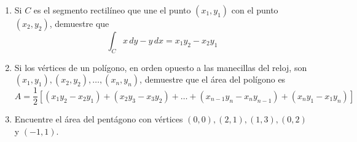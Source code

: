 \item
    \begin{enumerate}
        \item[(a)] Si $C$ es el segmento rectilíneo que une el punto $(x_1, y_1)$ con el punto $(x_2, y_2)$, demuestre que 
        \[ \int_C x \, dy - y \, dx = x_1 y_2 - x_2 y_1 \]
        \item[(b)] Si los vértices de un polígono, en orden opuesto a las manecillas del reloj, son $(x_1, y_1), (x_2, y_2), \dots , (x_n, y_n)$, demuestre que el área del polígono es
        \[ A = \frac{1}{2} [ (x_1 y_2 - x_2 y_1) + (x_2 y_3 - x_3 y_2) + \dots + (x_{n-1} y_n - x_n y_{n-1}) + (x_n y_1 - x_1 y_n) ] \]
        \item[(c)] Encuentre el área del pentágono con vértices $(0, 0), (2, 1), (1, 3), (0, 2)$ y $(-1, 1)$.
    \end{enumerate}
